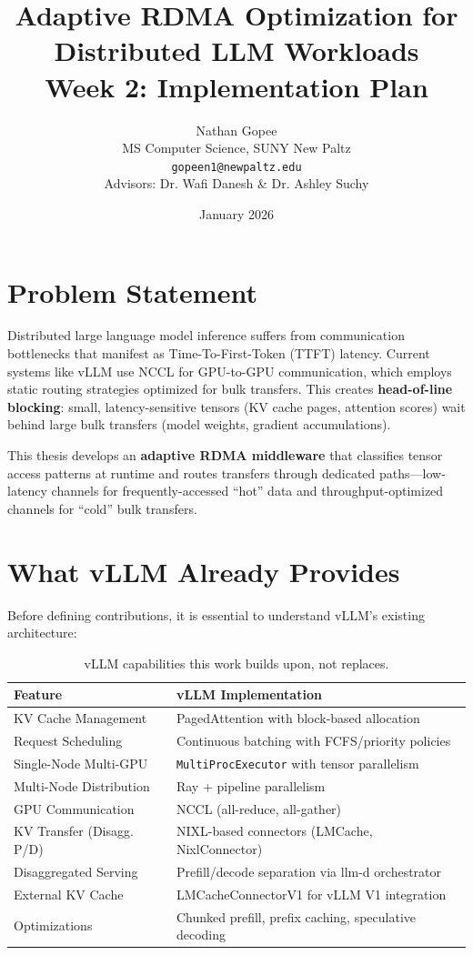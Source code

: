 \documentclass[10pt,letterpaper]{article}
\title{\textbf{Adaptive RDMA Optimization for Distributed LLM Workloads}\\[0.5em]
\large Week 2: Implementation Plan}
\author{Nathan Gopee\\
MS Computer Science, SUNY New Paltz\\
\texttt{gopeen1@newpaltz.edu}\\[1em]
\small Advisors: Dr. Wafi Danesh \& Dr. Ashley Suchy}
\date{January 2026}
\begin{document}
\maketitle

\section{Problem Statement}

Distributed large language model inference suffers from communication bottlenecks that manifest as Time-To-First-Token (TTFT) latency. Current systems like vLLM use NCCL for GPU-to-GPU communication, which employs static routing strategies optimized for bulk transfers. This creates \textbf{head-of-line blocking}: small, latency-sensitive tensors (KV cache pages, attention scores) wait behind large bulk transfers (model weights, gradient accumulations).

This thesis develops an \textbf{adaptive RDMA middleware} that classifies tensor access patterns at runtime and routes transfers through dedicated paths---low-latency channels for frequently-accessed ``hot'' data and throughput-optimized channels for ``cold'' bulk transfers.

\section{What vLLM Already Provides}

Before defining contributions, it is essential to understand vLLM's existing architecture:

\begin{table}[h]
\centering
\small
\begin{tabular}{@{}ll@{}}
\toprule
\textbf{Feature} & \textbf{vLLM Implementation} \\
\midrule
KV Cache Management & PagedAttention with block-based allocation \\
Request Scheduling & Continuous batching with FCFS/priority policies \\
Single-Node Multi-GPU & \texttt{MultiProcExecutor} with tensor parallelism \\
Multi-Node Distribution & Ray + pipeline parallelism \\
GPU Communication & NCCL (all-reduce, all-gather) \\
KV Transfer (Disagg. P/D) & NIXL-based connectors (LMCache, NixlConnector) \\
Disaggregated Serving & Prefill/decode separation via llm-d orchestrator \\
External KV Cache & LMCacheConnectorV1 for vLLM V1 integration \\
Optimizations & Chunked prefill, prefix caching, speculative decoding \\
\bottomrule
\end{tabular}
\caption{vLLM capabilities this work builds upon, not replaces.}
\end{table}
\end{document}

